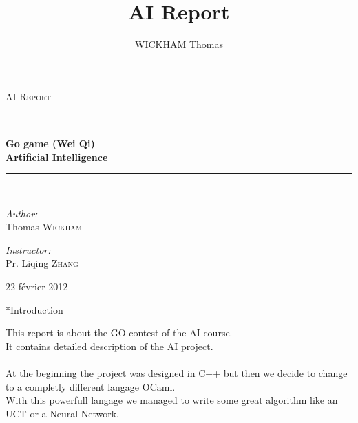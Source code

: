 \documentclass[12pt,a4paper,titlepage]{book}
\author{WICKHAM Thomas}
\title{AI Report}
\makeatletter
\newcommand{\HRule}{\rule{\linewidth}{0.5mm}}
\renewcommand\chapter{\clearpage\@startsection{chapter}{0}{1em}{\baselineskip}{2\baselineskip}{\Huge\textbf}}
\makeatother
\begin{document}
\begin{titlepage}

\begin{center}
\textsc{\LARGE AI Report}\\[0.5cm]


\HRule \\[1.0cm]
{\Huge \bfseries Go game (Wei Qi)\\[2ex]
Artificial Intelligence}\\[1.0cm]

\HRule \\[2.0cm]

\begin{minipage}{0.4\textwidth}
\begin{flushleft} \large
\emph{Author:}\\
Thomas \textsc{Wickham}
\end{flushleft}
\end{minipage}
\begin{minipage}{0.4\textwidth}
\begin{flushright} \large
\emph{Instructor:} \\
Pr. Liqing \textsc{Zhang}
\end{flushright}
\end{minipage}

\vfill

{\large 22 février 2012}

\end{center}

\end{titlepage}

\newpage


\tableofcontents

\chapter*{Introduction}

This report is about the GO contest of the AI course.\\
It contains detailed description of the AI project.\\
\\
At the beginning the project was designed in C++ but then we decide to change to
a completly different langage OCaml.\\
With this powerfull langage we managed to write some great algorithm like an UCT
or a Neural Network.\\
\end{document}
